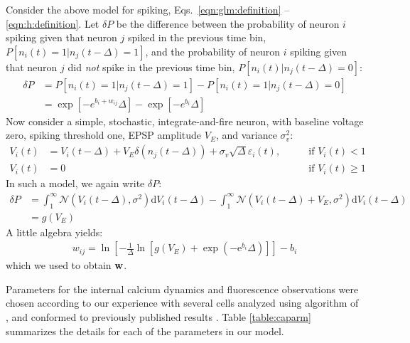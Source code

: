 Consider the above model for spiking, Eqs.~\eqref{eqn:glm:definition} -- \eqref{eqn:h:definition}.  Let $\delta P$ be the difference between the probability of neuron $i$ spiking given that neuron $j$ spiked in the previous time bin, $P[n_i(t)=1 | n_j(t-\Delta)=1]$, and the probability of neuron $i$ spiking given that neuron $j$ did \emph{not} spike in the previous time bin, $P[n_i(t) | n_j(t-\Delta)=0]$:
\begin{align}\label{eqn:convert:leadin-2}
\delta P &= P[n_i(t)=1 | n_j(t-\Delta)=1] - P[n_i(t)=1 | n_j(t-\Delta)=0] \nonumber
\\ &= \exp[-e^{b_i+w_{ij}}\Delta]-\exp[-e^{b_i}\Delta]
\end{align}
Now consider a simple, stochastic, integrate-and-fire neuron, with baseline voltage zero, spiking threshold one, EPSP amplitude $V_E$, and variance $\sigma_v^2$:
\begin{align}
	V_i(t) &= V_i(t-\Delta) + V_E \delta(n_j(t-\Delta)) + \sigma_v \sqrt{\Delta} \varepsilon_i(t), \qquad &\text{if } V_i(t)<1 \nonumber
\\	V_i(t) &= 0 &\text{if } V_i(t)\geq 1 
\end{align}
In such a model, we again write $\delta P$:
\begin{align}\label{eqn:convert:leadin-3}
\delta P &= \int_1^\infty \mathcal{N}(V_i(t-\Delta),\sigma^2) \text{d}V_i(t-\Delta) - \int_1^\infty \mathcal{N}(V_i(t-\Delta)+V_E,\sigma^2)\text{d}V_i(t-\Delta) \nonumber
\\ &=g(V_E)
\end{align}
A little algebra yields:
\begin{align}
	w_{ij}= \ln \left[ -\frac{1}{\Delta} \ln \left[g(V_E)+ \exp\left(-\text{e}^{b_i}\Delta\right)\right]\right]-b_i
\end{align}
which we used to obtain $\mathbf{w}$. 


Parameters for the internal calcium dynamics and fluorescence observations were chosen according to our experience with several cells analyzed using algorithm of \cite{Vogelstein2009}, and conformed to previously published results \cite{ImagingManual,HelmchenSakmann96,BrenowitzRegehr07}. %
Table \ref{table:caparm} summarizes the details for each of the parameters in our model.


